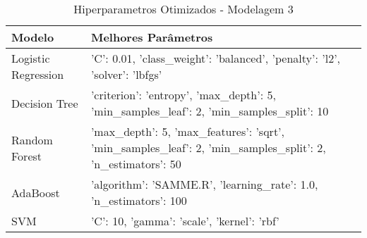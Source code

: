 \begin{table}[H] %
    \centering
    \caption{Hiperparametros Otimizados - Modelagem 3}
    \label{tab:melhores_parametros_otimizacao_modelagem_3}
    \renewcommand{\arraystretch}{1.25} %
    \begin{adjustwidth}{ -1in }{ -1in } %
    \centering %
    \small %
    \begin{tabular}{ll}
\toprule
             Modelo &                                                                                         Melhores Parâmetros \\
\midrule
Logistic Regression &                                 {'C': 0.01, 'class_weight': 'balanced', 'penalty': 'l2', 'solver': 'lbfgs'} \\
      Decision Tree &                    {'criterion': 'entropy', 'max_depth': 5, 'min_samples_leaf': 2, 'min_samples_split': 10} \\
      Random Forest & {'max_depth': 5, 'max_features': 'sqrt', 'min_samples_leaf': 2, 'min_samples_split': 2, 'n_estimators': 50} \\
           AdaBoost &                                         {'algorithm': 'SAMME.R', 'learning_rate': 1.0, 'n_estimators': 100} \\
                SVM &                                                                {'C': 10, 'gamma': 'scale', 'kernel': 'rbf'} \\
\bottomrule
\end{tabular}
    \end{adjustwidth}
    \renewcommand{\arraystretch}{1.0} %
\end{table}

